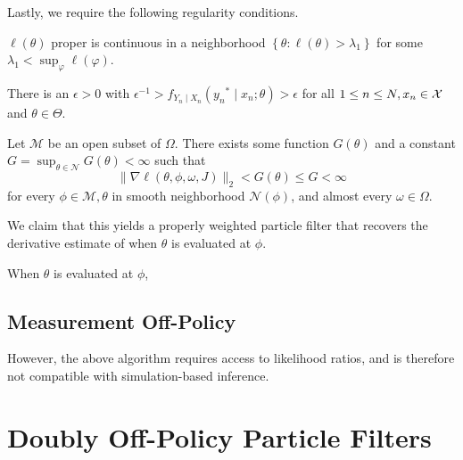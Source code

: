 \documentclass{article}
\begin{document}
Lastly, we require the following regularity conditions.

\begin{aspt} $\ell(\theta)$ proper is continuous in a neighborhood $\left\{\theta: \ell(\theta)>\lambda_1\right\}$ for some $\lambda_1<\sup _{\varphi} \ell(\varphi)$.
\end{aspt}

\begin{aspt} There is an $\epsilon>0$ with $\epsilon^{-1}>f_{Y_n \mid X_n}\left(y_n{ }^* \mid x_n; \theta\right)>\epsilon$ for all $1 \leq n \leq N, x_n \in {\mathcal{X}}$ and $\theta \in \Theta.$
\end{aspt}

\begin{aspt}
Let $\mathcal{M}$ be an open subset of $\Omega$. There exists some function $G(\theta)$ and a constant $G=\sup _{\theta \in \mathcal{N}} G(\theta)<\infty$ such that
    $$
    \|\nabla \ell(\theta, \phi, \omega, J)\|_2<G(\theta) \leq G<\infty
    $$
    for every $\phi \in \mathcal{M}, \theta$ in smooth neighborhood $\mathcal{N}(\phi)$, and almost every $\omega \in \Omega$.
\end{aspt}

We claim that this yields a properly weighted particle filter that recovers the derivative estimate of \citet{doucet2011sf, scibior2021dpf} when $\theta$ is evaluated at $\phi.$ 

\begin{prop}
    When $\theta$ is evaluated at $\phi$, 
\end{prop}

\subsection{Measurement Off-Policy}

However, the above algorithm requires access to likelihood ratios, and is therefore not compatible with simulation-based inference. 








\appendix
\renewcommand{\thefigure}{A\arabic{figure}}
\setcounter{figure}{0}

\section{Doubly Off-Policy Particle Filters}
\end{document}
